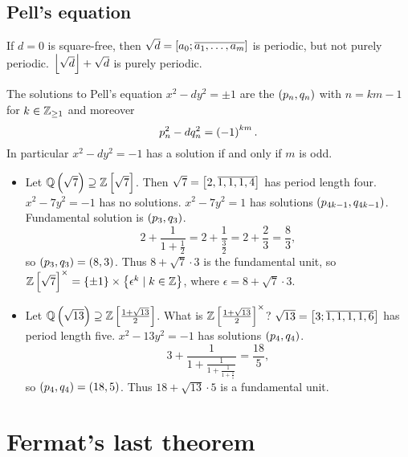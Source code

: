 \subsection{Pell's equation}

If $ d = 0 $ is square-free, then $ \sqrt{d} = \sbr{a_0; \overline{a_1, \dots, a_m}} $ is periodic, but not purely periodic. $ \left\lfloor \sqrt{d} \right\rfloor + \sqrt{d} $ is purely periodic.

\begin{theorem}
The solutions to Pell's equation $ x^2 - dy^2 = \pm 1 $ are the $ \br{p_n, q_n} $ with $ n = km - 1 $ for $ k \in \mathbb{Z}_{\ge 1} $ and moreover
$$ p_n^2 - dq_n^2 = \br{-1}^{km}. $$
In particular $ x^2 - dy^2 = -1 $ has a solution if and only if $ m $ is odd.
\end{theorem}

\begin{example*}
\hfill
\begin{itemize}
\item Let $ \Q\br{\sqrt{7}} \supseteq \Z\sbr{\sqrt{7}} $. Then $ \sqrt{7} = \sbr{2, \overline{1, 1, 1, 4}} $ has period length four. $ x^2 - 7y^2 = -1 $ has no solutions. $ x^2 - 7y^2 = 1 $ has solutions $ \br{p_{4k - 1}, q_{4k - 1}} $. Fundamental solution is $ \br{p_3, q_3} $.
$$ 2 + \dfrac{1}{1 + \tfrac{1}{2}} = 2 + \dfrac{1}{\tfrac{3}{2}} = 2 + \dfrac{2}{3} = \dfrac{8}{3}, $$
so $ \br{p_3, q_3} = \br{8, 3} $. Thus $ 8 + \sqrt{7} \cdot 3 $ is the fundamental unit, so $ \Z\sbr{\sqrt{7}}^\times = \cbr{\pm 1} \times \cbr{\epsilon^k \mid k \in \Z} $, where $ \epsilon = 8 + \sqrt{7} \cdot 3 $.
\item Let $ \Q\br{\sqrt{13}} \supseteq \Z\sbr{\tfrac{1 + \sqrt{13}}{2}} $. What is $ \Z\sbr{\tfrac{1 + \sqrt{13}}{2}}^\times $? $ \sqrt{13} = \sbr{3; \overline{1, 1, 1, 1, 6}} $ has period length five. $ x^2 - 13y^2 = -1 $ has solutions $ \br{p_4, q_4} $.
$$ 3 + \dfrac{1}{1 + \tfrac{1}{1 + \tfrac{1}{1 + \tfrac{1}{1}}}} = \dfrac{18}{5}, $$
so $ \br{p_4, q_4} = \br{18, 5} $. Thus $ 18 + \sqrt{13} \cdot 5 $ is a fundamental unit.
\end{itemize}
\end{example*}

\pagebreak

\appendix

\section{Fermat's last theorem}


